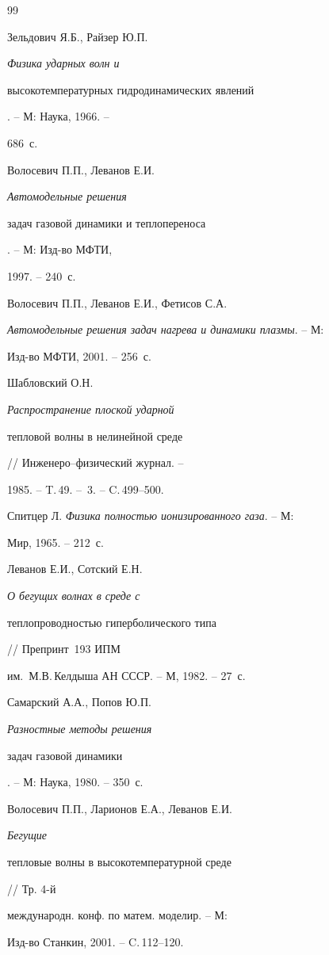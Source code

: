 \begin{thebibliography}{99}


Зельдович Я.Б., Райзер Ю.П. {\em Физика ударных волн и


высокотемпературных гидродинамических явлений}. -- М: Наука, 1966. --


686~с.




Волосевич П.П., Леванов Е.И. {\em Автомодельные решения


задач газовой динамики и теплопереноса}. -- М: Изд-во МФТИ,


1997. -- 240~с.




Волосевич П.П., Леванов Е.И., Фетисов С.А.


{\em Автомодельные решения задач нагрева и динамики плазмы}. -- М:


Изд-во МФТИ, 2001. -- 256~с.




Шабловский О.Н. {\em Распространение плоской ударной


тепловой волны в нелинейной среде} // Инженеро--физический журнал. --


1985. -- T.\,49. -- \No\,3. -- C.\,499--500.




Спитцер Л. {\em Физика полностью ионизированного газа}. -- М:


Мир, 1965. -- 212~с.




Леванов Е.И., Сотский Е.Н. {\em О бегущих волнах в среде с


теплопроводностью гиперболического типа} // Препринт \No\,193 ИПМ


им.~М.В.\,Келдыша АН СССР. -- М, 1982. -- 27~с.




Самарский А.А., Попов Ю.П. {\em Разностные методы решения


задач газовой динамики}. -- М: Наука, 1980. -- 350~с.




Волосевич П.П., Ларионов Е.А., Леванов Е.И. {\em Бегущие


тепловые волны в высокотемпературной среде} // Тр. 4-й


международн. конф. по матем. моделир. -- М:


Изд-во Станкин, 2001. -- C.\,112--120.





\end{thebibliography}





\vskip 2cm














\label{end}





